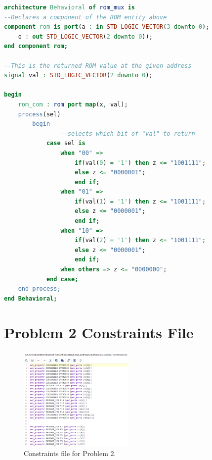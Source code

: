 \documentclass[11pt]{article}
\begin{document}
\begin{appendices}
\begin{lstlisting}[language=VHDL]
architecture Behavioral of rom_mux is
--Declares a component of the ROM entity above
component rom is port(a : in STD_LOGIC_VECTOR(3 downto 0); 
	o : out STD_LOGIC_VECTOR(2 downto 0));
end component rom;

--This is the returned ROM value at the given address
signal val : STD_LOGIC_VECTOR(2 downto 0);

begin
    rom_com : rom port map(x, val);
    process(sel)
        begin
        		--selects which bit of "val" to return
            case sel is
                when "00" => 
                    if(val(0) = '1') then z <= "1001111";
                    else z <= "0000001";
                    end if;
                when "01" =>
                    if(val(1) = '1') then z <= "1001111";
                    else z <= "0000001";
                    end if;
                when "10" => 
                    if(val(2) = '1') then z <= "1001111";
                    else z <= "0000001";
                    end if;
                when others => z <= "0000000";
            end case;
    end process;
end Behavioral;
\end{lstlisting}

\section{Problem 2 Constraints File}
\begin{figure}[H]
\begin{center}
	\includegraphics[width=0.5\textwidth]{../report-images/Part2Const.png}
	\caption{\label{fig:Part2ConstFile}Constraints file for Problem 2.}
\end{center}
\end{figure}

\end{appendices}
\end{document}
